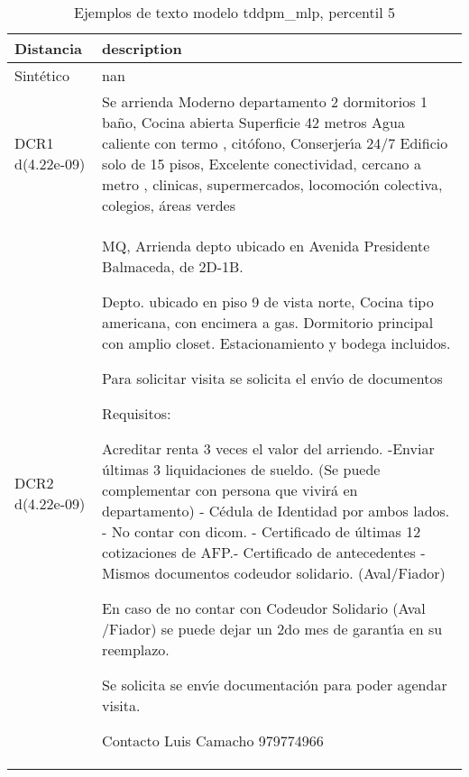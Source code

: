 \begin{table}[H]
\centering
\fontsize{10}{14}\selectfont
\caption{Ejemplos de texto modelo tddpm\_mlp, percentil 5}
\label{table-example-economicos-a-3-tddpm_mlp-5p-text}
\begin{tabular}{|l|m{35em}|}
\hline
\rowcolor[gray]{0.8}
Distancia & description \\
\hline Sintético & nan \\
\hline DCR1 d(4.22e-09) & Se arrienda Moderno departamento  2 dormitorios 1 ba\~no, Cocina abierta Superficie 42 metros Agua caliente con termo , cit\'ofono, Conserjer{\'\i}a 24/7 Edificio solo de 15 pisos, Excelente conectividad, cercano a metro , clinicas, supermercados, locomoci\'on colectiva, colegios, \'areas verdes \\
\hline DCR2 d(4.22e-09) & MQ, Arrienda depto ubicado en Avenida Presidente Balmaceda, de 2D-1B.

Depto. ubicado en piso 9 de vista norte,
Cocina tipo americana, con encimera a gas.
Dormitorio principal con amplio closet.
Estacionamiento y bodega incluidos.

Para solicitar visita se solicita el env{\'\i}o de documentos

Requisitos:

Acreditar renta 3 veces el valor del arriendo. 
-Enviar \'ultimas 3 liquidaciones de sueldo. (Se puede complementar con persona que vivir\'a en departamento)
- C\'edula de Identidad por ambos lados.
- No contar con dicom.
- Certificado de \'ultimas 12 cotizaciones de AFP.- Certificado de antecedentes
- Mismos documentos codeudor solidario. (Aval/Fiador)

En caso de no contar con Codeudor Solidario (Aval /Fiador) se puede dejar un 2do mes de garant{\'\i}a en su reemplazo.

Se solicita se env{\'\i}e documentaci\'on para poder agendar visita.


Contacto
Luis Camacho
979774966 \\
\hline
\end{tabular}
\end{table}
